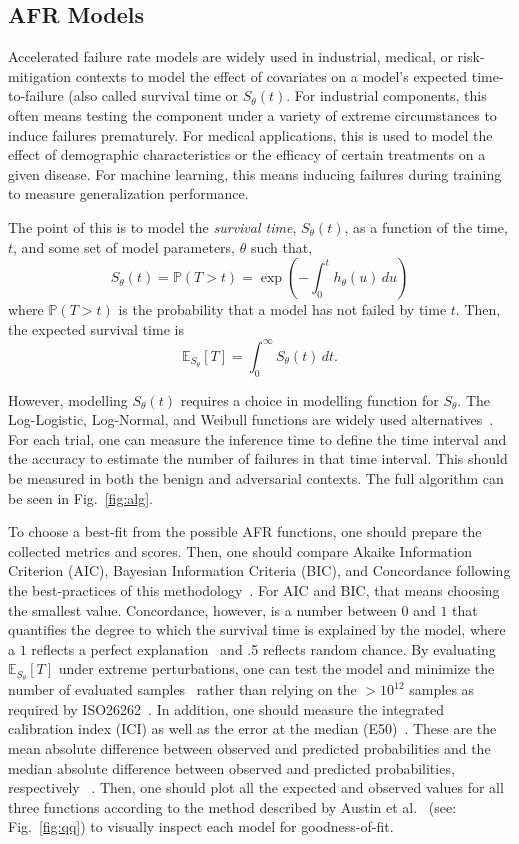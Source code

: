 \documentclass[conference]{IEEEtran}
\begin{document}
\subsection{AFR Models}
\label{survival_time}
Accelerated failure rate models are widely used in industrial, medical, or risk-mitigation contexts \cite{kleinbaum1996survival, aft_models} to model the effect of covariates on a model's expected time-to-failure (also called survival time or $S_{\theta}(t)$. For industrial components, this often means testing the component under a variety  of extreme circumstances to induce failures prematurely. For medical applications, this is used to model the effect of demographic characteristics or the efficacy of certain treatments on a given disease. For machine learning, this means inducing failures during training to measure generalization performance.

The point of this is to model the \textit{survival time}, $S_{\theta}(t)$, as a function of the time, $t$,  and some set of model parameters, $\theta$ such that,
$$
S_{\theta}(t)= \mathbb{P}(T>t) = \exp\left(-\int_0^t h_{\theta}(u) \, du\right)
$$
where $\mathbb{P}(T>t)$ is the probability that a model has not failed by time $t$. Then, the expected survival time is
\[
	\mathbb{E}_{S_\theta}[T] = \int_0^{\infty}  S_\theta(t) \,dt.
\]

However, modelling $S_{\theta}(t)$ requires a choice in modelling function for $S_{\theta}$. The Log-Logistic, Log-Normal, and Weibull functions are widely used alternatives~\cite{kleinbaum1996survival}. For each trial, one can measure the inference time to define the time interval and the accuracy to estimate the number of failures in that time interval. This should be measured in both the benign and adversarial contexts. The full algorithm can be seen in Fig.~\ref{fig:alg}.

To choose a best-fit from the possible AFR functions, one should prepare the collected metrics and scores. Then, one should compare Akaike Information Criterion (AIC), Bayesian Information Criteria (BIC), and Concordance following the best-practices of this methodology~\cite{aft_models,kleinbaum1996survival}. For AIC and BIC, that means choosing the smallest value. Concordance, however, is a number between $0$ and $1$ that quantifies the degree to which the survival time is explained by the model, where a $1$ reflects a perfect explanation~\cite{kleinbaum1996survival} and .5 reflects random chance. By evaluating $\mathbb{E}_{S_\theta}[T]$ under extreme perturbations, one can test the model and minimize the number of evaluated samples~\cite{aft_models,kleinbaum1996survival} rather than relying on the $> 10^{12}$ samples as required by ISO26262~\cite{iso26262}. In addition, one should measure the integrated calibration index (ICI) as well as the error at the median (E50)~\cite{ici}. These are the mean absolute difference between observed and predicted probabilities and the median absolute difference between observed and predicted probabilities, respectively ~\cite{ici}. Then, one should plot all the expected and observed values for all three functions according to the method described by Austin et al.~\cite{ici} (see: Fig.~\ref{fig:qq}) to visually inspect each model for goodness-of-fit.
\end{document}
